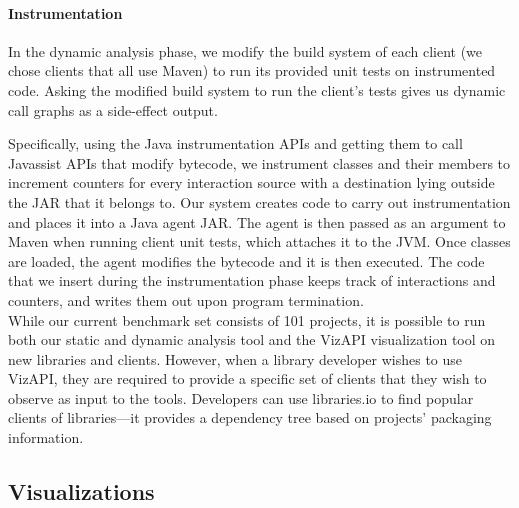 \paragraph{Instrumentation}
In the dynamic analysis phase, we modify the build system of each
client (we chose clients that all use Maven) to run its provided unit tests on instrumented code.
Asking the modified build system to run the client's tests gives us dynamic call graphs as a side-effect output.

Specifically, using the Java instrumentation APIs and getting them to call Javassist APIs that modify bytecode,
we instrument classes and their members to increment counters for every interaction source
with a destination lying outside the JAR that it belongs to.
Our system creates code to carry out instrumentation and places it into a Java agent JAR.
The agent is then passed as an argument to Maven when running client unit tests, which attaches it to the JVM.
Once classes are loaded, the agent modifies the bytecode and it is then executed.
The code that we insert during the instrumentation phase keeps track of interactions and counters,
and writes them out upon program termination. \\


While our current benchmark set consists of 101 projects, it is possible to run both our static and dynamic analysis tool and the VizAPI visualization tool on new libraries and clients. However, when a library developer wishes to use VizAPI, they are required to provide a specific set of clients that they wish to observe as input to the tools. Developers can use libraries.io to find popular clients of libraries---it provides a dependency tree based on projects' packaging information.


\subsection{Visualizations}
\label{subsec:vis-system}

